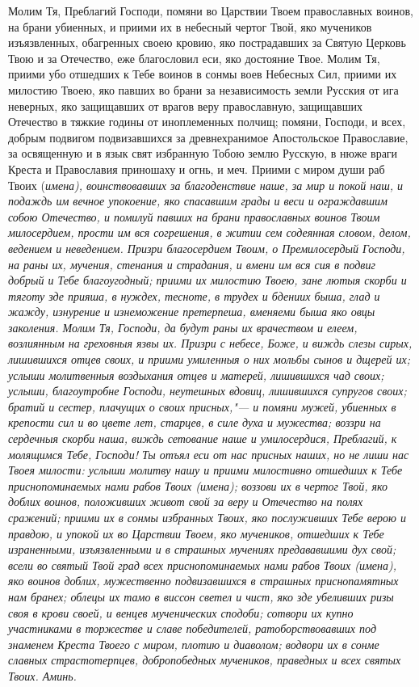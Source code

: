 Молим Тя, Преблагий Господи, помяни во Царствии Твоем православных воинов, на брани убиенных, и приими их в небесный чертог Твой, яко мучеников изъязвленных, обагренных своею кровию, яко пострадавших за Святую Церковь Твою и за Отечество, еже благословил еси, яко достояние Твое. Молим Тя, приими убо отшедших к Тебе воинов в сонмы воев Небесных Сил, приими их милостию Твоею, яко павших во брани за независимость земли Русския от ига неверных, яко защищавших от врагов веру православную, защищавших Отечество в тяжкие годины от иноплеменных полчищ; помяни, Господи, и всех, добрым подвигом подвизавшихся за древнехранимое Апостольское Православие, за освященную и в язык свят избранную Тобою землю Русскую, в нюже враги Креста и Православия приношаху и огнь, и меч. Приими с миром души раб Твоих (\itshape имена\normalfont{}), воинствовавших за благоденствие наше, за мир и покой наш, и подаждь им вечное упокоение, яко спасавшим грады и веси и ограждавшим собою Отечество, и помилуй павших на брани православных воинов Твоим милосердием, прости им вся согрешения, в житии сем содеянная словом, делом, ведением и неведением. Призри благосердием Твоим, о Премилосердый Господи, на раны их, мучения, стенания и страдания, и вмени им вся сия в подвиг добрый и Тебе благоугодный; приими их милостию Твоею, зане лютыя скорби и тяготу зде прияша, в нуждех, тесноте, в трудех и бдениих быша, глад и жажду, изнурение и изнеможение претерпеша, вменяеми быша яко овцы заколения. Молим Тя, Господи, да будут раны их врачеством и елеем, возлиянным на греховныя язвы их. Призри с небесе, Боже, и виждь слезы сирых, лишившихся отцев своих, и приими умиленныя о них мольбы сынов и дщерей их; услыши молитвенныя воздыхания отцев и матерей, лишившихся чад своих; услыши, благоутробне Господи, неутешных вдовиц, лишившихся супругов своих; братий и сестер, плачущих о своих присных,"--- и помяни мужей, убиенных в крепости сил и во цвете лет, старцев, в силе духа и мужества; воззри на сердечныя скорби наша, виждь сетование наше и умилосердися, Преблагий, к молящимся Тебе, Господи! Ты отъял еси от нас присных наших, но не лиши нас Твоея милости: услыши молитву нашу и приими милостивно отшедших к Тебе приснопоминаемых нами рабов Твоих (\itshape имена\normalfont{}); воззови их в чертог Твой, яко доблих воинов, положивших живот свой за веру и Отечество на полях сражений; приими их в сонмы избранных Твоих, яко послуживших Тебе верою и правдою, и упокой их во Царствии Твоем, яко мучеников, отшедших к Тебе израненными, изъязвленными и в страшных мучениях предававшими дух свой; всели во святый Твой град всех приснопоминаемых нами рабов Твоих (\itshape имена\normalfont{}), яко воинов доблих, мужественно подвизавшихся в страшных приснопамятных нам бранех; облецы их тамо в виссон светел и чист, яко зде убеливших ризы своя в крови своей, и венцев мученических сподоби; сотвори их купно участниками в торжестве и славе победителей, ратоборствовавших под знаменем Креста Твоего с миром, плотию и диаволом; водвори их в сонме славных страстотерпцев, добропобедных мучеников, праведных и всех святых Твоих. Аминь. 
\mychapterending

